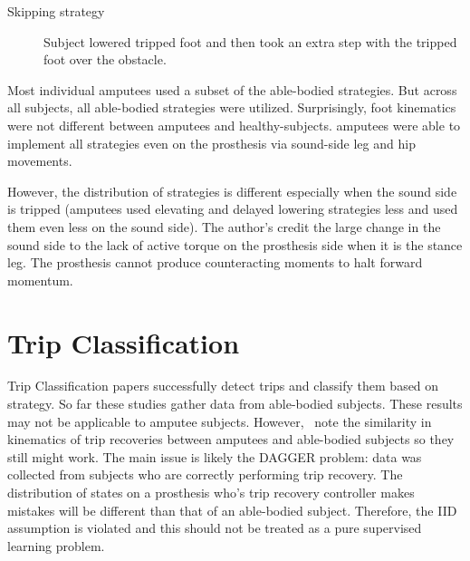 \begin{enumerate}
\begin{description}
        \item[Skipping strategy] Subject lowered tripped foot and then took an
        extra step with the tripped foot over the obstacle.
    \end{description}
    
    Most individual amputees used a subset of the able-bodied strategies. But
    across all subjects, all able-bodied strategies were utilized. Surprisingly,
    foot kinematics were not different between amputees and healthy-subjects.
    \ie amputees were able to implement all strategies even on the prosthesis
    via sound-side leg and hip movements.
    
    However, the distribution of strategies is different especially when the
    sound side is tripped (amputees used elevating and delayed lowering
    strategies less and used them even less on the sound side). The author's
    credit the large change in the sound side to the lack of active torque on
    the prosthesis side when it is the stance leg. The prosthesis cannot produce
    counteracting moments to halt forward momentum.  
    
\end{enumerate}

\section{Trip Classification} 

Trip Classification papers successfully detect trips and classify them based on
strategy. So far these studies gather data from able-bodied subjects. These
results may not be applicable to amputee subjects.
However,~\citet{shirota2015transfemoral} note the similarity in kinematics of
trip recoveries between amputees and able-bodied subjects so they still might
work.  The main issue is likely the DAGGER problem: data was collected from
subjects who are correctly performing trip recovery. The distribution of states
on a prosthesis who's trip recovery controller makes mistakes will be different
than that of an able-bodied subject. Therefore, the IID assumption is violated
and this should not be treated as a pure supervised learning problem.

